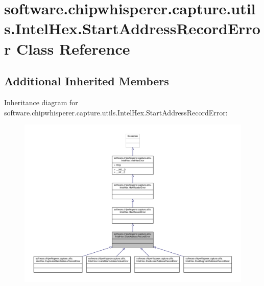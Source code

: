 \hypertarget{classsoftware_1_1chipwhisperer_1_1capture_1_1utils_1_1IntelHex_1_1StartAddressRecordError}{}\section{software.\+chipwhisperer.\+capture.\+utils.\+Intel\+Hex.\+Start\+Address\+Record\+Error Class Reference}
\label{classsoftware_1_1chipwhisperer_1_1capture_1_1utils_1_1IntelHex_1_1StartAddressRecordError}
\subsection*{Additional Inherited Members}


Inheritance diagram for software.\+chipwhisperer.\+capture.\+utils.\+Intel\+Hex.\+Start\+Address\+Record\+Error\+:\nopagebreak
\begin{figure}[H]
\begin{center}
\leavevmode
\includegraphics[width=350pt]{d3/daa/classsoftware_1_1chipwhisperer_1_1capture_1_1utils_1_1IntelHex_1_1StartAddressRecordError__inherit__graph}
\end{center}
\end{figure}


